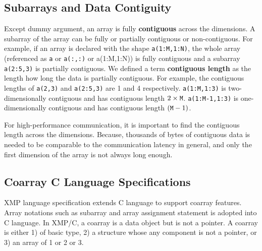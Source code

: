 \subsection{Subarrays and Data Contiguity}\label{sec:spec-contig}

Except dummy argument, an array is fully {\bf contiguous} across the dimensions.
A subarray of the array can be fully or partially contiguous or non-contiguous.
For example, if an array is declared with the shape {\tt a(1:M,1:N)},
the whole array (referenced as {\tt a} or {\tt a(:,:)} or {a(1:M,1:N)})
is fully contiguous and a subarray {\tt a(2:5,3)} is partially contiguous.
We defined a term {\bf contiguous length} as the length how long the data is partially
contiguous. For example, the contiguous lengths of {\tt a(2,3)} and {\tt a(2:5,3)} are
1 and 4 respectively.  {\tt a(1:M,1:3)} is two-dimensionally contiguous and has 
contiguous length $2 \times {\tt M}$.
{\tt a(1:M-1,1:3)} is one-dimensionally contiguous and has 
contiguous length $({\tt M} - 1)$.

\requirement
For high-performance communication, it is important to find the contiguous length
across the dimensions. Because, thousands of bytes of contiguous data is needed to be 
comparable to the communication latency in general, and only the first dimension 
of the array is not always long enough.
%


\subsection{Coarray C Language Specifications}\label{sec:spec-c}

XMP language specification extends C language to support coarray 
features. Array notations such as subarray and array assignment statement
is adopted into C language.
%
In XMP/C, a coarray is a data object but is not a pointer.
A coarray is either 1) of basic type, 2) a structure whose
any component is not a pointer, or 3) an array of 1 or 2 or 3.

